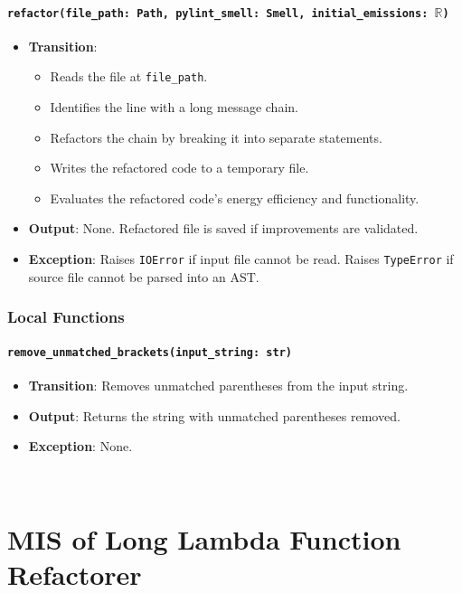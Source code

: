 \documentclass[12pt, titlepage]{article}
\begin{document}
\paragraph{\texttt{refactor(file\_path: Path, pylint\_smell: Smell, initial\_emissions: $\mathbb{R}$)}}
\begin{itemize}
  \item \textbf{Transition}:
    \begin{itemize}
    \item Reads the file at \texttt{file\_path}.
    \item Identifies the line with a long message chain.
    \item Refactors the chain by breaking it into separate statements.
    \item Writes the refactored code to a temporary file.
    \item Evaluates the refactored code’s energy efficiency and functionality.
    \end{itemize}
  \item \textbf{Output}: None. Refactored file is saved if improvements are validated.
  \item \textbf{Exception}: Raises \texttt{IOError} if input file cannot be read. Raises \texttt{TypeError} if source file cannot be parsed into an AST.
\end{itemize}

\subsubsection{Local Functions}
\paragraph{\texttt{remove\_unmatched\_brackets(input\_string: str)}}
\begin{itemize}
\item \textbf{Transition}: Removes unmatched parentheses from the input string.
\item \textbf{Output}: Returns the string with unmatched parentheses removed.
\item \textbf{Exception}: None.
\end{itemize}

~\newpage

\section{MIS of Long Lambda Function Refactorer} \label{mis:LLF}
\end{document}
